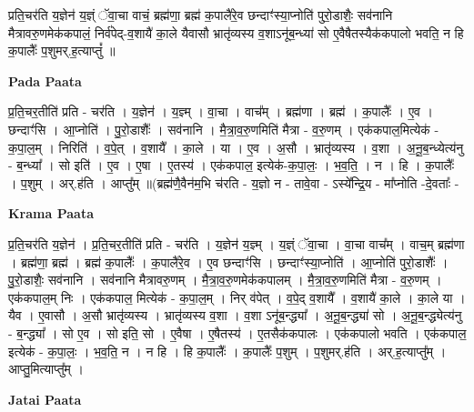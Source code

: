 \documentclass[17pt]{extarticle}
\begin{document}
प्रति॒चर॑ति य॒ज्ञेन॑ य॒ज्ञ्ं ॅवा॒चा वाचं॒ ब्रह्म॑णा॒ ब्रह्म॑ क॒पालै॑रे॒व छन्दाꣳ॑स्या॒प्नोति॑ पुरो॒डाशैः॒ सव॑नानि मैत्रावरु॒णमेक॑कपालं॒ निर्व॑पेद्-व॒शायै॑ का॒ले यैवासौ भ्रातृ॑व्यस्य व॒शाऽनू॑ब॒न्ध्या॑ सो ए॒वैषैतस्यैक॑कपालो भवति॒ न हि क॒पालैः᳚ प॒शुमर्.ह॒त्याप्तुं᳚ ॥ \newline

\textbf{Pada Paata} \newline

प्र॒ति॒चर॒तीति॑ प्रति - चर॑ति । य॒ज्ञेन॑ । य॒ज्ञ्म् । वा॒चा । वाच᳚म् । ब्रह्म॑णा । ब्रह्म॑ । क॒पालैः᳚ । ए॒व । छन्दाꣳ॑सि । आ॒प्नोति॑ । पु॒रो॒डाशैः᳚ । सव॑नानि । मै॒त्रा॒व॒रु॒णमिति॑ मैत्रा - व॒रु॒णम् । एक॑कपाल॒मित्येक॑ - क॒पा॒ल॒म् । निरिति॑ । व॒पे॒त् । व॒शायै᳚ । का॒ले । या । ए॒व । अ॒सौ । भ्रातृ॑व्यस्य । व॒शा । अ॒नू॒ब॒न्ध्येत्य॑नु - ब॒न्ध्या᳚ । सो इति॑ । ए॒व । ए॒षा । ए॒तस्य॑ । एक॑कपाल॒ इत्येक॑-क॒पा॒लः॒ । भ॒व॒ति॒ । न । हि । क॒पालैः᳚ । प॒शुम् । अर्.ह॑ति । आप्तु᳚म् ॥(ब्रह्म॑णै॒वैन॑म॒भि च॑रति - य॒ज्ञो न - तावे॒वा - ऽस्ये᳚न्द्रि॒य - मा᳚प्नोति -दे॒वताः᳚ -  \newline


\textbf{Krama Paata} \newline

प्र॒ति॒चर॑ति य॒ज्ञेन॑ । प्र॒ति॒चर॒तीति॑ प्रति - चर॑ति । य॒ज्ञेन॑ य॒ज्ञ्म् । य॒ज्ञ्ं ॅवा॒चा । वा॒चा वाच᳚म् । वाच॒म् ब्रह्म॑णा । ब्रह्म॑णा॒ ब्रह्म॑ । ब्रह्म॑ क॒पालैः᳚ । क॒पालै॑रे॒व । ए॒व छन्दाꣳ॑सि । छन्दाꣳ॑स्या॒प्नोति॑ । आ॒प्नोति॑ पुरो॒डाशैः᳚ । पु॒रो॒डाशैः॒ सव॑नानि । सव॑नानि मैत्रावरु॒णम् । मै॒त्रा॒व॒रु॒णमेक॑कपालम् । मै॒त्रा॒व॒रु॒णमिति॑ मैत्रा - व॒रु॒णम् । एक॑कपाल॒म् निः । एक॑कपाल॒ मित्येक॑ - क॒पा॒ल॒म् । निर् व॑पेत् । व॒पे॒द् व॒शायै᳚ । व॒शायै॑ का॒ले । का॒ले या । यैव । ए॒वासौ । अ॒सौ भ्रातृ॑व्यस्य । भ्रातृ॑व्यस्य व॒शा । व॒शा ऽनू॑ब॒न्द्ध्या᳚ । अ॒नू॒ब॒न्द्ध्या॑ सो । अ॒नू॒ब॒न्द्ध्येत्य॑नु - ब॒न्द्ध्या᳚ । सो ए॒व । सो इति॒ सो । ए॒वैषा । ए॒षैतस्य॑ । ए॒तसैक॑कपालः । एक॑कपालो भवति । एक॑कपाल॒ इत्येक॑ - क॒पा॒लः॒ । भ॒व॒ति॒ न । न हि । हि क॒पालैः᳚ । क॒पालैः᳚ प॒शुम् । प॒शुमर्.ह॑ति । अर्.ह॒त्याप्तु᳚म् । आप्तु॒मित्याप्तु᳚म् । \newline

\textbf{Jatai Paata} \newline
\end{document}
